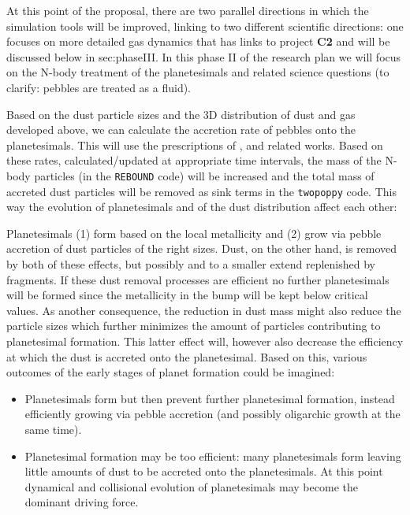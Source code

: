 \documentclass[10pt,fleqn,twoside]{article}
\newcommand{\twopoppy}{\texttt{twopoppy}\xspace}
\newcommand{\rebound}{\texttt{REBOUND}\xspace}
\newcommand{\cref}[1]{#1}
\begin{document}
At this point of the proposal, there are two parallel directions in
which the simulation tools will be improved, linking to two different
scientific directions: one focuses on more detailed gas dynamics that
has links to project \textbf{C2} and will be discussed below in
\cref{sec:phaseIII}. In this phase II of the research plan we will
focus on the N-body treatment of the planetesimals and related science
questions (to clarify: pebbles are treated as a fluid).

Based on the dust particle sizes and the 3D distribution of dust and
gas developed above, we can calculate the accretion rate of pebbles
onto the planetesimals. This will use the prescriptions of
\citet{2010A&A...520A..43O}, \citet{2016A&A...586A..66V} and related
works. Based on these rates, calculated/updated at appropriate time
intervals, the mass of the N-body particles (in the \rebound code)
will be increased and the total mass of accreted dust particles will
be removed as sink terms in the \twopoppy code. This way the evolution
of planetesimals and of the dust distribution affect each other:

Planetesimals (1) form based on the local metallicity and (2) grow via
pebble accretion of dust particles of the right sizes. Dust, on the
other hand, is removed by both of these effects, but possibly and to a
smaller extend replenished by fragments. If these dust removal
processes are efficient no further planetesimals will be formed since
the metallicity in the bump will be kept below critical values.
As another consequence, the reduction in dust mass might also reduce
the particle sizes which further minimizes the amount of particles
contributing to planetesimal formation. This latter effect will,
however also decrease the efficiency at which the dust is accreted
onto the planetesimal.
Based on this, various outcomes of the early stages of planet
formation could be imagined:
\begin{itemize}
  \item Planetesimals form but then prevent further planetesimal
  formation, instead efficiently growing via pebble accretion (and
  possibly oligarchic growth at the same time).
  \item  Planetesimal formation may be too efficient: many
  planetesimals form leaving little amounts of dust to be accreted
  onto the planetesimals. At this point dynamical and collisional
  evolution of planetesimals may become the dominant driving force.
\end{itemize}
\end{document}
